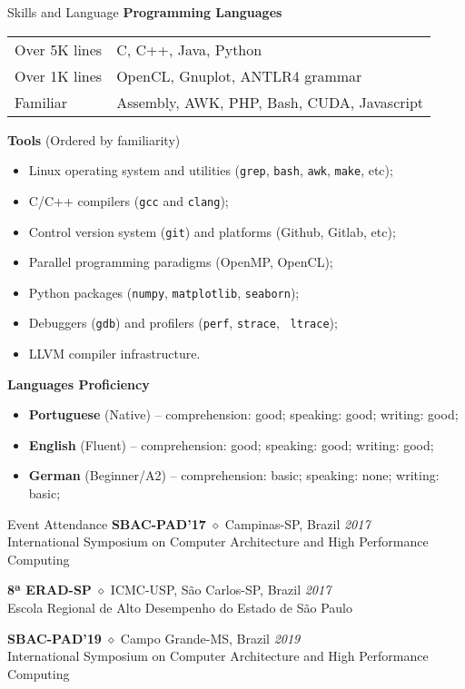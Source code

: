 \documentclass{resume}
\begin{document}

\begin{rSection}{Skills and Language}
{\bf Programming Languages}

\begin{tabular}{ll}
  Over 5K lines & C, C++, Java, Python \\
  Over 1K lines & OpenCL, Gnuplot, ANTLR4 grammar \\
  Familiar      & Assembly, AWK, PHP, Bash, CUDA, Javascript \\
\end{tabular}

{\bf Tools} {\small (Ordered by familiarity)}
\begin{itemize}[noitemsep]
  \item Linux operating system and utilities ({\tt grep}, {\tt bash}, {\tt awk},
    {\tt make}, etc);
  \item C/C++ compilers ({\tt gcc} and {\tt clang});
  \item Control version system ({\tt git}) and platforms (Github, Gitlab, etc);
  \item Parallel programming paradigms (OpenMP, OpenCL);
  \item Python packages ({\tt numpy}, {\tt matplotlib}, {\tt seaborn});
  \item Debuggers ({\tt gdb}) and profilers ({\tt perf}, {\tt strace}, {\tt
    ltrace});
  \item LLVM compiler infrastructure.
\end{itemize}

{\bf Languages Proficiency}
\begin{itemize}[noitemsep]
  \item {\bf Portuguese} (Native) -- comprehension: good; speaking: good; writing: good;
  \item {\bf English} (Fluent) -- comprehension: good; speaking: good; writing: good;
  \item {\bf German} (Beginner/A2) -- comprehension: basic; speaking: none; writing: basic;
\end{itemize}
\end{rSection}

\begin{rSection}{Event Attendance}
{\bf SBAC-PAD'17} $\diamond$ Campinas-SP, Brazil \hfill {\em 2017} \\
International Symposium on Computer Architecture and High Performance
Computing

{\bf 8ª ERAD-SP} $\diamond$ ICMC-USP, São Carlos-SP, Brazil \hfill {\em 2017} \\
Escola Regional de Alto Desempenho do Estado de São Paulo

{\bf SBAC-PAD'19} $\diamond$ Campo Grande-MS, Brazil \hfill {\em 2019} \\
International Symposium on Computer Architecture and High Performance
Computing
\end{rSection}
\end{document}
